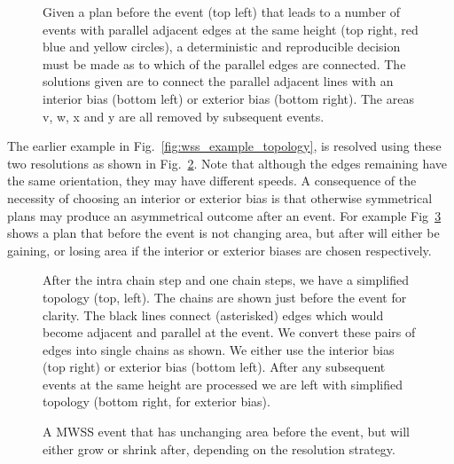 \begin{figure}
  \centering
  \def\svgwidth{0.7\columnwidth}
  
  \caption[Global coordination of a solution with parallel edges]{\label{fig:wss_linear_align} Given a plan before the event (top left) that leads to a number of events with parallel adjacent edges at the same height (top right, red blue and yellow circles), a deterministic and reproducible decision must be made as to which of the parallel edges are connected. The solutions given are to connect the parallel adjacent lines with an interior bias (bottom left) or exterior bias (bottom right). The areas v, w, x and y are all removed by subsequent events.}
\end{figure}

The earlier example in Fig.~\ref{fig:wss_example_topology}, is resolved using these two resolutions as shown in Fig.~\ref{fig:wss_equal_approach_killer}. Note that although the edges remaining have the same orientation, they may have different speeds. A consequence of the necessity of choosing an interior or exterior bias is that otherwise symmetrical plans may produce an asymmetrical outcome after an event. For example Fig~\ref{fig:skel_impossible} shows a plan that before the event is not changing area, but after will either be gaining, or losing area if the interior or exterior biases are chosen respectively.

\begin{figure}
  \centering
  \def\svgwidth{1.0\columnwidth}
  
  \caption[Removing zero area chains]{\label{fig:wss_equal_approach_killer} After the intra chain step and one chain steps, we have a simplified topology (top, left). The chains are shown just before the event for clarity. The black lines connect (asterisked) edges which would become adjacent and parallel at the event. We convert these pairs of edges into single chains as shown. We either use the interior bias (top right) or exterior bias (bottom left). After any subsequent events at the same height are processed we are left with simplified topology (bottom right, for exterior bias).
}
\end{figure}

\begin{figure}
  \centering
  \def\svgwidth{1.0\columnwidth}
  
  \caption[A MWSS event that cannot be fairly solved]{\label{fig:skel_impossible}A MWSS event that has unchanging area before the event, but will either grow or shrink after, depending on the resolution strategy.}
\end{figure}


